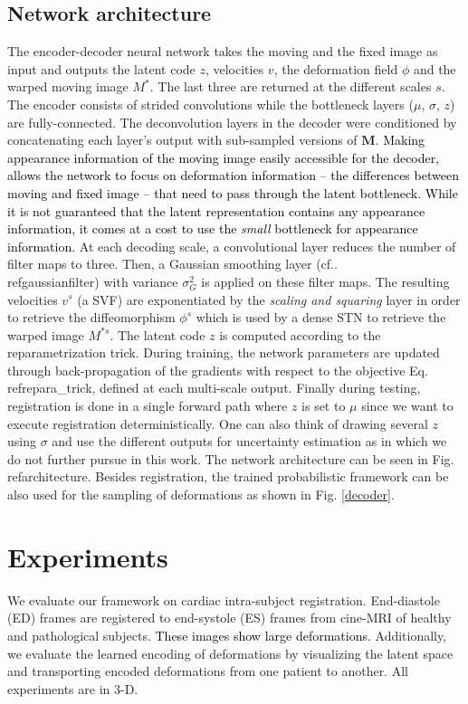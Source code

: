 \documentclass[journal]{IEEEtran}
\newcommand{\update}[1]{\textcolor{black}{#1}}
\begin{document}
\subsection{Network architecture}
The encoder-decoder neural network takes the moving and the fixed image as input and outputs the latent code $z$, velocities $v$, the deformation field $\phi$ and the warped moving image $M^*$. The last three are returned at the different scales $s$. The encoder consists of strided convolutions while the bottleneck layers ($\mu$, $\sigma$, $z$) are fully-connected. The deconvolution layers in the decoder were conditioned by concatenating each layer's output with sub-sampled versions of $\mathbf{M}$. \update{Making appearance information of the moving image easily accessible for the decoder, allows the network to focus on deformation information -- the differences between moving and fixed image -- that need to pass through the latent bottleneck. While it is not guaranteed that the latent representation contains any appearance information, it comes at a cost to use the \emph{small} bottleneck for appearance information.} At each decoding scale, a convolutional layer reduces the number of filter maps to three. Then, a Gaussian smoothing layer (cf.\Eq.\\ref{gaussianfilter}) with variance $\sigma_G^2$ is applied on these filter maps. The resulting velocities $v^s$ (a SVF) are exponentiated by the \emph{scaling and squaring} layer \cite{krebs2018unsupervised} in order to retrieve the diffeomorphism $\phi^s$ which is used by a dense STN to retrieve the warped image $M^{*s}$. The latent code $z$ is computed according to the reparametrization trick. During training, the network parameters are updated through back-propagation of the gradients with respect to the objective Eq.\\ref{repara_trick}, defined at each multi-scale output. Finally during testing, registration is done in a single forward path where $z$ is set to $\mu$ since we want to execute registration deterministically. One can also think of drawing several $z$ using $\sigma$ and use the different outputs for uncertainty estimation as in \cite{dalca2018unsupervised} which we do not further pursue in this work. The network architecture can be seen in Fig.\\ref{architecture}. Besides registration, the trained probabilistic framework can be also used for the sampling of deformations as shown in Fig. \ref{decoder}. 

\section{Experiments}
We evaluate our framework on cardiac intra-subject registration. End-diastole (ED) frames are registered to end-systole (ES) frames from cine-MRI of healthy and pathological subjects\update{. These images show large deformations.} Additionally, we evaluate the learned encoding of deformations by visualizing the latent space and transporting encoded deformations from one patient to another. All experiments are in 3-D. 
\end{document}
